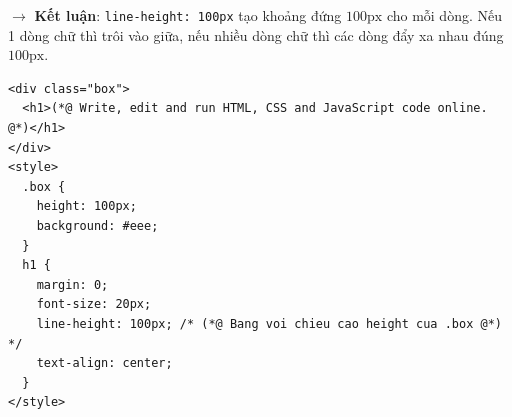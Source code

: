 \documentclass[11pt,oneside]{book}
\newcommand{\codeinline}[1]{\textcolor{accentOrange}{\texttt{#1}}}
\begin{document}
\begin{browserWindow}
\begin{tcolorbox}[arc=6pt, colback=white, colframe=primaryBlue!30, boxrule=1pt, top=14pt, bottom=14pt, left=10pt, right=10pt]
  \par\vspace{10pt}
  {\sffamily\small\color{gray!70} $\rightarrow$ \textbf{Kết luận}: \codeinline{line-height: 100px} tạo khoảng đứng $100\text{px}$ cho mỗi dòng. Nếu 1 dòng chữ thì trôi vào giữa, nếu nhiều dòng chữ thì các dòng đẩy xa nhau đúng $100\text{px}$.}
\end{tcolorbox}
\end{browserWindow}

\begin{codeWindow}
\begin{lstlisting}[language=HTML5]
<div class="box">
  <h1>(*@ Write, edit and run HTML, CSS and JavaScript code online. @*)</h1>
</div>
<style>
  .box {
    height: 100px;
    background: #eee;
  }
  h1 {
    margin: 0;
    font-size: 20px;
    line-height: 100px; /* (*@ Bang voi chieu cao height cua .box @*) */
    text-align: center;
  }
</style>
\end{lstlisting}
\end{codeWindow}
\end{document}
